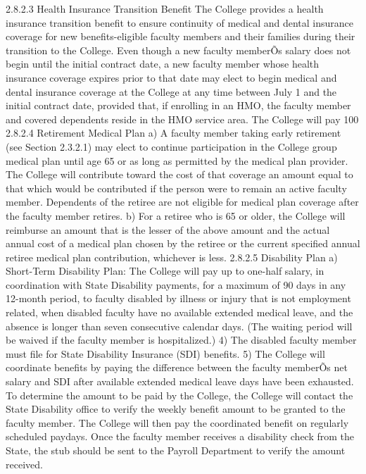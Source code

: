 \documentclass[letterpaper, 11pt]{article}
\begin{document}
2.8.2.3 Health Insurance Transition Benefit
   The College provides a health insurance transition benefit to ensure continuity of medical and dental insurance coverage for new benefits-eligible faculty members and their families during their transition to the College.  Even though a new faculty memberÕs salary does not begin until the initial contract date, a new faculty member whose health insurance coverage expires prior to that date may elect to begin medical and dental insurance coverage at the College at any time between July 1 and the initial contract date, provided that, if enrolling in an HMO, the faculty member and covered dependents reside in the HMO service area.  The College will pay 100%
2.8.2.4 Retirement Medical Plan
a) A faculty member taking early retirement (see Section 2.3.2.1) may elect to continue participation in the College group medical plan until age 65 or as long as permitted by the medical plan provider.  The College will contribute toward the cost of that coverage an amount equal to that which would be contributed if the person were to remain an active faculty member.  Dependents of the retiree are not eligible for medical plan coverage after the faculty member retires.
b) For a retiree who is 65 or older, the College will reimburse an amount that is the lesser of the above amount and the actual annual cost of a medical plan chosen by the retiree or the current specified annual retiree medical plan contribution, whichever is less.
2.8.2.5 Disability Plan
a) Short-Term Disability Plan:  The College will pay up to one-half salary, in coordination with State Disability payments, for a maximum of 90 days in any 12-month period, to faculty disabled by illness or injury that is not employment related, when disabled faculty have no available extended medical leave, and the absence is longer than seven consecutive calendar days.  (The waiting period will be waived if the faculty member is hospitalized.)
4) The disabled faculty member must file for State Disability Insurance (SDI) benefits.
5) The College will coordinate benefits by paying the difference between the faculty memberÕs net salary and SDI after available extended medical leave days have been exhausted.  To determine the amount to be paid by the College, the College will contact the State Disability office to verify the weekly benefit amount to be granted to the faculty member.  The College will then pay the coordinated benefit on regularly scheduled paydays.  Once the faculty member receives a disability check from the State, the stub should be sent to the Payroll Department to verify the amount received.
\end{document}
